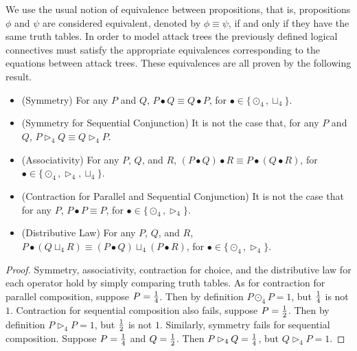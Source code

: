 We use the usual notion of equivalence between propositions, that is,
propositions $\phi$ and $\psi$ are considered equivalent, denoted by
$\phi \equiv \psi$, if and only if they have the same truth tables. In
order to model attack trees the previously defined logical connectives
must satisfy the appropriate equivalences corresponding to the
equations between attack trees.  These equivalences are all proven by
the following result.
\begin{lemma}
  \label{lemma:props_atree_ops_quaternary-semantics}
  \begin{itemize}
  \item[] (Symmetry) For any $P$ and $Q$, $P \bullet Q \equiv Q \bullet P$, for $\bullet \in \{\odot_4, \sqcup_4\}$.\\[-5px]
  \item[] (Symmetry for Sequential Conjunction) It is not the case that, for any $P$ and $Q$, $P \rhd_4 Q \equiv Q \rhd_4 P$.\\[-5px]
  \item[] (Associativity) For any $P$, $Q$, and $R$, $(P \bullet Q) \bullet R \equiv P \bullet (Q \bullet R)$, for $\bullet \in \{\odot_4, \rhd_4, \sqcup_4\}$.\\[-5px]
  \item[] (Contraction for Parallel and Sequential Conjunction) It is not the case that for any $P$, $P \bullet P \equiv P$, for $\bullet \in \{\odot_4, \rhd_4\}$.\\[-5px]
  \item[] (Distributive Law) For any $P$, $Q$, and $R$, $P \bullet (Q \sqcup_4 R) \equiv (P \bullet Q) \sqcup_4 (P \bullet R)$, for $\bullet \in \{\odot_4, \rhd_4\}$.\\[-5px]
  \end{itemize}
\end{lemma}
\begin{proof}
  Symmetry, associativity, contraction for choice, and the
  distributive law for each operator hold by simply comparing truth
  tables.  As for contraction for parallel composition, suppose $P =
  \frac{1}{4}$.  Then by definition $P \odot_4 P = 1$, but $\frac{1}{4}$ is not
  $1$.  Contraction for sequential composition also fails, suppose $P
  = \frac{1}{2}$.  Then by definition $P \rhd_4 P = 1$, but $\frac{1}{2}$ is not
  $1$.  Similarly, symmetry fails for sequential composition. Suppose
  $P = \frac{1}{4}$ and $Q = \frac{1}{2}$.  Then $P \rhd_4 Q = \frac{1}{4}$, but $Q
  \rhd_4 P = 1$.
\end{proof}

